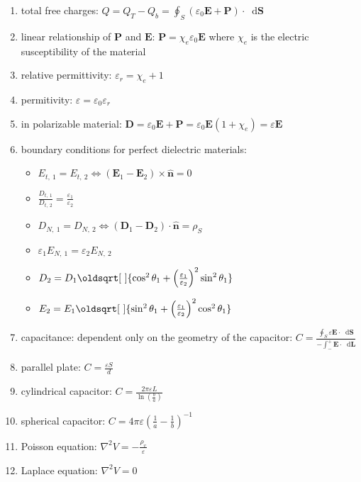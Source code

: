 \documentclass[a4paper,11pt]{article}
\renewcommand*{\sqrt}[2][\ ]{\oldsqrt[#1]{#2}}
\newcommand*\dd{\mathop{}\!\mathrm{d}}
\newcommand{\grad}{\nabla}
\newcommand{\bvec}[1]{\mathbf{#1}}
\newcommand{\bhat}[1]{\hat{\mathbf{#1}}}
\begin{document}
\begin{enumerate}
		\item total free charges: $Q = Q_T - Q_b = \oint_S(\varepsilon_0\bvec{E} + \bvec{P})\cdot  \dd\bvec{S}$
		\item linear relationship of $\bvec{P}$ and $\bvec{E}$: $\bvec{P} = \chi_e\varepsilon_0\bvec{E}$ where $\chi_e$ is the electric susceptibility of the material
		\item relative permittivity: $\varepsilon_r = \chi_e + 1$
		\item permitivity: $\varepsilon = \varepsilon_0\varepsilon_r$
		\item in polarizable material: $\bvec{D} = \varepsilon_0\bvec{E} + \bvec{P} = \varepsilon_0\bvec{E}(1 + \chi_e) = \varepsilon\bvec{E}$
		\item boundary conditions for perfect dielectric materials: 
			\begin{itemize}
				\item $E_{t,~1} = E_{t,~2} \Longleftrightarrow (\bvec{E}_1 - \bvec{E}_2) \times \bhat{n} = 0$
				\item $\frac{D_{t,~1}}{D_{t,~2}} = \frac{\varepsilon_1}{\varepsilon_2}$
				\item $D_{N,~1} = D_{N,~2} \Longleftrightarrow (\bvec{D}_1 - \bvec{D}_2) \cdot \bhat{n} = \rho_S$
				\item $\varepsilon_1E_{N,~1} = \varepsilon_2E_{N,~2}$
				\item $D_2 = D_1 \sqrt{\cos^2\theta_1 + \left(\frac{\varepsilon_1}{\varepsilon_2}\right)^2\sin^2\theta_1}$ 
				\item $E_2 = E_1 \sqrt{\sin^2\theta_1 + \left(\frac{\varepsilon_1}{\varepsilon_2}\right)^2\cos^2\theta_1}$ 
			\end{itemize}
		\item capacitance: dependent only on the geometry of the capacitor: $C = \frac{\oint_S \varepsilon\bvec{E} \cdot \dd \bvec{S}}{-\int_-^+ \bvec{E} \cdot \dd\bvec{L}}$	
		\item parallel plate: $C = \frac{\varepsilon S}{d}$
		\item cylindrical capacitor: $C = \frac{2\pi\varepsilon L}{\ln\left(\frac{b}{a}\right)}$
		\item spherical capacitor: $C = 4\pi\varepsilon \left(\frac{1}{a} - \frac{1}{b}\right)^{-1}$
		\item Poisson equation: $\grad^2 V = -\frac{\rho_v}{\varepsilon}$
		\item Laplace equation: $\grad^2 V = 0$
	\end{enumerate}
\end{document}
